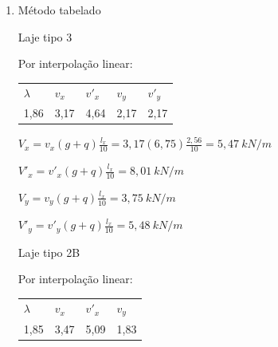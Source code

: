\begin{resposta}
\begin{enumerate}[start=2]
\begin{enumerate}
            $q_h = 1 \ kN/m$ \cite[tabela 12]{nbr6120} \newline

            $V'_x=(g+q)\ell_x+g_m+q\to g_m=1,1 \ h_m\newline V'_x\approx6,75\times1,53+1,1\times 1 +2\newline V'_x\approx13,43\ kN/m$ \newline


            \item Método tabelado

    
            

            Laje tipo 3 \cite[tabela 2.2b]{tabelalajes}

            Por interpolação linear:

            \begin{table}[h]
                \centering
                \color{gray!80!black} 
                \begin{tabular}{l l l l l}
                    $\lambda$ & $v_x$ & $v'_x$ & $v_y$ & $v'_y$ \\
                    1,86 & 3,17 & 4,64 & 2,17 & 2,17
                \end{tabular}
            \end{table}

            $V_x = v_x(g+q)\frac{l_x}{10}= 3,17 (6,75) \frac{2,56}{10}= 5,47 \ kN/m$

            $V'_x = v'_x(g+q)\frac{l_x}{10}= 8,01 \ kN/m$

            $V_y = v_y(g+q)\frac{l_x}{10}= 3,75 \ kN/m$

            $V'_y = v'_y(g+q)\frac{l_x}{10}= 5,48 \ kN/m$
    
    
            

            Laje tipo 2B \cite[tabela 2.2a]{tabelalajes}

            Por interpolação linear:

            \begin{table}[h]
                \centering
                \color{gray!80!black} 
                \begin{tabular}{l l l l}
                    $\lambda$ & $v_x$ & $v'_x$ & $v_y$  \\
                    1,85 & 3,47 & 5,09 & 1,83 
                \end{tabular}
            \end{table}


\end{enumerate}
\end{enumerate}
\end{resposta}
